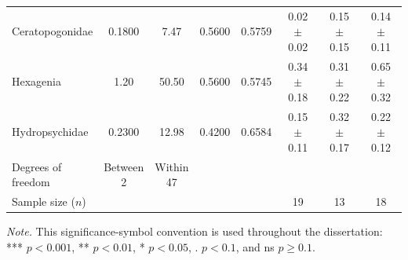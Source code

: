 \begin{table}[htbp]
\begin{tabular*}{\textwidth}{@{\extracolsep{\fill}}lccccccc@{}}
    Ceratopogonidae & 0.1800 & 7.47 & 0.5600 & 0.5759 & 0.02 $\pm$ 0.02 & 0.15 $\pm$ 0.15 & 0.14 $\pm$ 0.11 \\
    Hexagenia & 1.20 & 50.50 & 0.5600 & 0.5745 & 0.34 $\pm$ 0.18 & 0.31 $\pm$ 0.22 & 0.65 $\pm$ 0.32 \\
    Hydropsychidae & 0.2300 & 12.98 & 0.4200 & 0.6584 & 0.15 $\pm$ 0.11 & 0.32 $\pm$ 0.17 & 0.22 $\pm$ 0.12 \\
    \midrule
    \makecell[l]{Degrees of\\freedom} & \makecell[c]{Between\\2} & \makecell[c]{Within\\47} &  &  &  &  &  \\
    Sample size ($n$) &  &  &  &  & 19 & 13 & 18 \\
    \bottomrule
  \end{tabular*}
  \par\vspace{2pt}
  {\raggedright\footnotesize \textit{Note.} This significance-symbol convention is used throughout the dissertation: *** $p<0.001$, ** $p<0.01$, * $p<0.05$, . $p<0.1$, and ns $p\ge 0.1$.\par}
\end{table}
